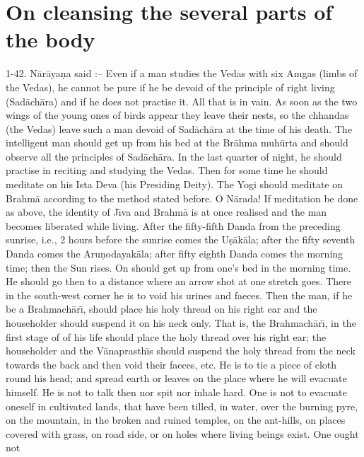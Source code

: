 \chapter{On cleansing the several parts of the body}

1-42. N\=ar\=aya\d{n}a said :-- Even if a man studies the Vedas with six Amgas (limbs of the Vedas), he cannot be pure if he be devoid of the principle of right living (Sad\=ach\=ara) and if he does not practise it. All that is in vain. As soon as the two wings of the young ones of birds appear they leave their nests, so the chhandas (the Vedas) leave such a man devoid of Sad\=ach\=ara at the time of his death. The intelligent man should get up from his bed at the Br\=ahma muh\=urta and should observe all the principles of Sad\=ach\=ara. In the last quarter of night, he should practise in reciting and studying the Vedas. Then for some time he should meditate on his Ista Deva (his Presiding Deity). The Yogi should meditate on Brahm\=a according to the method stated before. O N\=arada! If meditation be done as above, the identity of J\={\i}va and Brahm\=a is at once realised and the man becomes liberated while living. After the fifty-fifth Danda from the preceding sunrise, i.e., 2 hours before the sunrise comes the U\d{s}\=ak\=ala; after the fifty seventh Danda comes the Aru\d{n}odayak\=ala; after fifty eighth Danda comes the morning time; then the Sun rises. On should get up from one's bed in the morning time. He should go then to a distance where an arrow shot at one stretch goes. There in the south-west corner he is to void his urines and faeces. Then the man, if he be a Brahmach\=ar\={\i}, should place his holy thread on his right ear and the householder should suspend it on his neck only. That is, the Brahmach\=ar\={\i}, in the first stage of of his life should place the holy thread over his right ear; the householder and the V\=anaprasth\={\i}s should suspend the holy thread from the neck towards the back and then void their faeces, etc. He is to tie a piece of cloth round his head; and spread earth or leaves on the place where he will evacuate himself. He is not to talk then nor spit nor inhale hard. One is not to evacuate oneself in cultivated lands, that have been tilled, in water, over the burning pyre, on the mountain, in the broken and ruined temples, on the ant-hills, on places covered with grass, on road side, or on holes where living beings exist. One ought not

